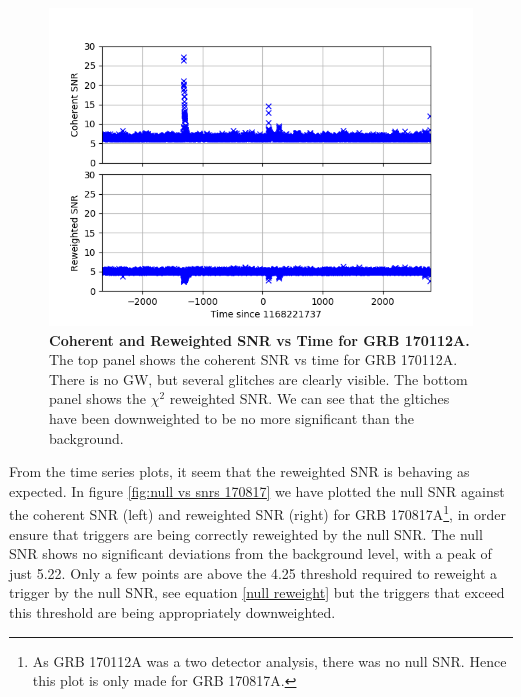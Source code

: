 \documentclass[11pt]{cuthesis}
\begin{document}
\begin{figure} %
\begin{center}
\includegraphics[width=0.8\linewidth]{network_snrs_vs_time_GRB170112A.png}
\end{center}
\caption{\textbf{Coherent and Reweighted SNR vs Time for GRB 170112A.} The top panel shows the coherent SNR vs time for GRB 170112A. There is no GW, but several glitches are clearly visible. The bottom panel shows the $\chi^2$ reweighted SNR. We can see that the gltiches have been downweighted to be no more significant than the background.} 
\label{fig:snr vs time GRB170112A}
\end{figure}

From the time series plots, it seem that the reweighted SNR is behaving as expected. In figure \ref{fig:null vs snrs 170817} we have plotted the null SNR against the coherent SNR (left) and reweighted SNR (right) for GRB 170817A\footnote{As GRB 170112A was a two detector analysis, there was no null SNR. Hence this plot is only made for GRB 170817A.}, in order ensure that triggers are being correctly reweighted by the null SNR. The null SNR shows no significant deviations from the background level, with a peak of just 5.22. Only a few points are above the 4.25 threshold required to reweight a trigger by the null SNR, see equation \ref{null reweight} but the triggers that exceed this threshold are being appropriately downweighted. 
\end{document}
